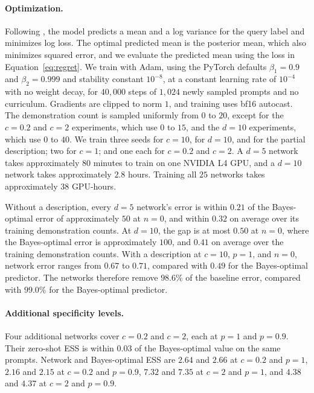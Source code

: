 \documentclass{article}
\theoremstyle{definition}
\begin{document}
\paragraph{Optimization.}
Following \citet{zhu2026}, the model predicts a mean and a log variance for the query label and minimizes log loss. The optimal predicted mean is the posterior mean, which also minimizes squared error, and we evaluate the predicted mean using the loss in Equation~\eqref{eq:regret}. We train with Adam, using the PyTorch defaults $\beta_1 = 0.9$ and $\beta_2 = 0.999$ and stability constant $10^{-8}$, at a constant learning rate of $10^{-4}$ with no weight decay, for $40{,}000$ steps of $1{,}024$ newly sampled prompts and no curriculum. Gradients are clipped to norm $1$, and training uses bf16 autocast. The demonstration count is sampled uniformly from $0$ to $20$, except for the $c = 0.2$ and $c = 2$ experiments, which use $0$ to $15$, and the $d = 10$ experiments, which use $0$ to $40$. We train three seeds for $c = 10$, for $d = 10$, and for the partial description; two for $c = 1$; and one each for $c = 0.2$ and $c = 2$. A $d = 5$ network takes approximately $80$ minutes to train on one NVIDIA L4 GPU, and a $d = 10$ network takes approximately $2.8$ hours. Training all $25$ networks takes approximately $38$ GPU-hours.

Without a description, every $d = 5$ network's error is within $0.21$ of the Bayes-optimal error of approximately $50$ at $n = 0$, and within $0.32$ on average over its training demonstration counts. At $d = 10$, the gap is at most $0.50$ at $n=0$, where the Bayes-optimal error is approximately $100$, and $0.41$ on average over the training demonstration counts. With a description at $c = 10$, $p = 1$, and $n = 0$, network error ranges from $0.67$ to $0.71$, compared with $0.49$ for the Bayes-optimal predictor. The networks therefore remove $98.6\%$ of the baseline error, compared with $99.0\%$ for the Bayes-optimal predictor.

\paragraph{Additional specificity levels.}
Four additional networks cover $c = 0.2$ and $c = 2$, each at $p = 1$ and $p = 0.9$. Their zero-shot ESS is within $0.03$ of the Bayes-optimal value on the same prompts. Network and Bayes-optimal ESS are $2.64$ and $2.66$ at $c=0.2$ and $p=1$, $2.16$ and $2.15$ at $c=0.2$ and $p=0.9$, $7.32$ and $7.35$ at $c=2$ and $p=1$, and $4.38$ and $4.37$ at $c=2$ and $p=0.9$.
\end{document}
